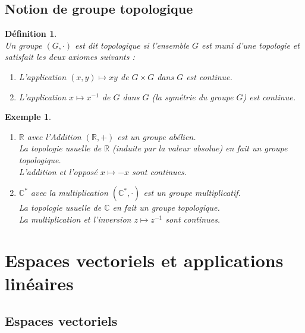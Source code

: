 \documentclass[a4paper, 14pt]{report}
\newtheorem{definition}{Définition}[section]
\newtheorem{example}{Exemple}[section]
\begin{document}
\begin{onehalfspace}
{			\subsection{Notion de groupe topologique}
			\begin{definition} \cite{bourbaki2013general} \\
				Un groupe \((G, \cdot)\) est dit topologique si l'ensemble $G$ est muni d’une topologie et satisfait les deux axiomes suivants :
				\begin{enumerate} [label=\roman*)]
					\item L'application $(x, y) \mapsto xy$ de $G \times G$ dans $G$ est continue.
					\item L'application $x \mapsto x^{-1}$ de $G$ dans $G$ (la symétrie du groupe $G$) est continue.
				\end{enumerate}
			\end{definition}
			
			\begin{example}\
				\begin{enumerate} 
					\item $\mathbb{R}$ avec l'Addition $(\mathbb{R}, +)$ est un groupe abélien.\\
					La topologie usuelle de $\mathbb{R}$ (induite par la valeur absolue) en fait un groupe topologique.\\
					L'addition et l'opposé $x \mapsto -x$ sont continues.
					\item  $\mathbb{C}^*$ avec la multiplication $(\mathbb{C}^*, \cdot)$ est un groupe multiplicatif.\\
					La topologie usuelle de $\mathbb{C}$ en fait un groupe topologique.\\
					La multiplication et l'inversion $z \mapsto z^{-1}$ sont continues.
				\end{enumerate}
			\end{example}
			
			
			
			\section{Espaces vectoriels et applications linéaires}
			\subsection{Espaces vectoriels}
			
}
\end{onehalfspace}
\end{document}

